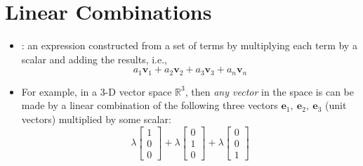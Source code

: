 \section{Linear Combinations}\label{Linear Combinations}
\begin{itemize}
  \item {}: an expression constructed from a set of terms by multiplying each term by a scalar and adding the results, i.e.,
  \[%
  a_1\bm{v}_1 +  a_2\bm{v}_2 +  a_3\bm{v}_3 +  a_n\bm{v}_n   
  \]%
  \item For example, in a 3-D vector space \(\mathbb{R}^3\), then \emph{any vector} in the space is can be made by a linear combination of the following three vectors \(\bm{e}_1,~\bm{e}_2,~\bm{e}_3\) (unit vectors) multiplied by some scalar:
  \[%
  \lambda\begin{bmatrix} 1 \\ 0 \\ 0 \end{bmatrix} +
  \lambda\begin{bmatrix} 0 \\ 1 \\ 0 \end{bmatrix} + 
  \lambda\begin{bmatrix} 0 \\ 0 \\ 1 \end{bmatrix}
  \]%


\end{itemize}
